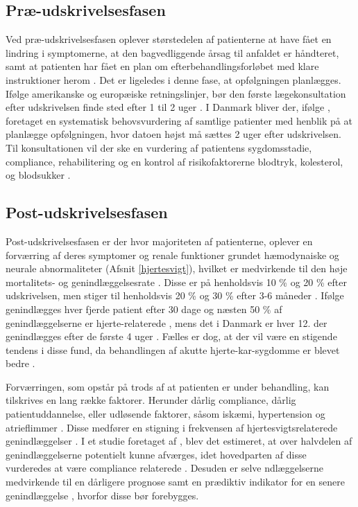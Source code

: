 \subsection{Præ-udskrivelsesfasen}
Ved præ-udskrivelsesfasen oplever størstedelen af patienterne at have fået en lindring i symptomerne, at den bagvedliggende årsag til anfaldet er håndteret, samt at patienten har fået en plan om efterbehandlingsforløbet med klare instruktioner herom \citep{Gheorghiade2009}. Det er ligeledes i denne fase, at opfølgningen planlægges. Ifølge amerikanske og europæiske retningslinjer, bør den første lægekonsultation efter udskrivelsen finde sted efter 1 til 2 uger \citep{Yancy2013}. I Danmark bliver der, ifølge \citet{Sundhedsstyrelsen2018}, foretaget en systematisk behovsvurdering af samtlige patienter med henblik på at planlægge opfølgningen, hvor datoen højst må sættes 2 uger efter udskrivelsen. Til konsultationen vil der ske en vurdering af patientens sygdomsstadie, compliance, rehabilitering og en kontrol af risikofaktorerne blodtryk, kolesterol, og blodsukker \citep{Hjerteinsufficiens} \citep{EdokHjertesvigt}.

\subsection{Post-udskrivelsesfasen}
Post-udskrivelsesfasen er der hvor majoriteten af patienterne, oplever en forværring af deres symptomer og renale funktioner grundet hæmodynaiske og neurale abnormaliteter (Afsnit \ref{hjertesvigt}), hvilket er medvirkende til den høje mortalitets- og genindlæggelsesrate \citep{Gheorghiade2009}. Disse er på henholdsvis 10 \% og 20 \% efter udskrivelsen, men stiger til henholdsvis 20 \% og 30 \% efter 3-6 måneder \citep{GFonarow2007}.
Ifølge \citet{Keenan2008} genindlægges hver fjerde patient efter 30 dage og næsten 50 \% af genindlæggelserne er hjerte-relaterede \citep{Gheorghiade2009} \citep{Inan2018}, mens det i Danmark er hver 12. der genindlægges efter de første 4 uger \citep{RKKP2017}. Fælles er dog, at der vil være en stigende tendens i disse fund, da behandlingen af akutte hjerte-kar-sygdomme er blevet bedre \citep{heartfailure} \citep{Gheorghiade2009}.

Forværringen, som opstår på trods af at patienten er under behandling, kan tilskrives en lang række faktorer. Herunder dårlig compliance, dårlig patientuddannelse, eller udløsende faktorer, såsom iskæmi, hypertension og atrieflimmer \citep{Gheorghiade2009}. Disse medfører en stigning i frekvensen af hjertesvigtsrelaterede genindlæggelser \citep{Murray2009}. I et studie foretaget af \citet{Michalsen1998}, blev det estimeret, at over halvdelen af genindlæggelserne potentielt kunne afværges, idet hovedparten af disse vurderedes at være compliance relaterede \citep{Michalsen1998} \citep{Hjerteinsufficiens}. Desuden er selve ndlæggelserne medvirkende til en dårligere prognose samt en prædiktiv indikator for en senere genindlæggelse \citep{Gheorghiade2009}, hvorfor disse bør forebygges.

